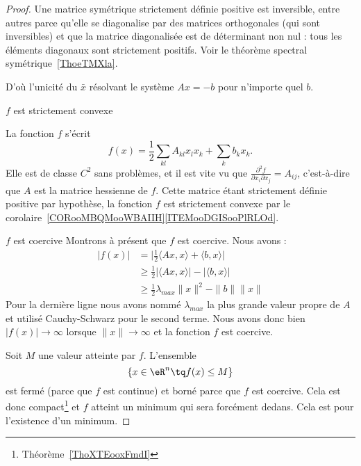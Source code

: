 \begin{proof}

	Une matrice symétrique strictement définie positive est inversible, entre autres parce qu'elle se diagonalise par des matrices orthogonales (qui sont inversibles) et que la matrice diagonalisée est de déterminant non nul : tous les éléments diagonaux sont strictement positifs. Voir le théorème spectral symétrique~\ref{ThoeTMXla}.

	D'où l'unicité du \( \bar x\) résolvant le système \( Ax=-b\) pour n'importe quel \( b\).

	\begin{subproof}
		\item[\( f\) est strictement convexe]

		La fonction \( f\) s'écrit
		\begin{equation}
			f(x)=\frac{ 1 }{2}\sum_{kl}A_{kl}x_lx_k+\sum_kb_kx_k.
		\end{equation}
		Elle est de classe \( C^2\) sans problèmes, et il est vite vu que \( \frac{ \partial^2f }{ \partial x_i\partial x_j }=A_{ij}\), c'est-à-dire que \( A\) est la matrice hessienne de \( f\). Cette matrice étant strictement définie positive par hypothèse, la fonction \( f\) est strictement convexe par le corolaire~\ref{CORooMBQMooWBAIIH}\ref{ITEMooDGISooPlRLOd}.

		\item[\( f\) est coercive]
		Montrons à présent que \( f\) est coercive. Nous avons :
		\begin{subequations}
			\begin{align}
				| f(x) | & =\big| \frac{ 1 }{2}\langle Ax, x\rangle +\langle b, x\rangle  \big| \\
				         & \geq\frac{ 1 }{2}| \langle Ax, x\rangle  |-| \langle b, x\rangle  |  \\
				         & \geq\frac{ 1 }{2}\lambda_{max}\| x \|^2-\| b \|\| x \|
			\end{align}
		\end{subequations}
		Pour la dernière ligne nous avons nommé \( \lambda_{max}\) la plus grande valeur propre de \( A\) et utilisé Cauchy-Schwarz pour le second terme. Nous avons donc bien \( | f(x) |\to \infty\) lorsque \( \| x \|\to\infty\) et la fonction \( f\) est coercive.
	\end{subproof}

	Soit \( M\) une valeur atteinte par \( f\). L'ensemble
	\begin{equation}
		\{ x\in \eR^n\tq f(x)\leq M \}
	\end{equation}
	est fermé (parce que \( f\) est continue) et borné parce que \( f\) est coercive. Cela est donc compact\footnote{Théorème~\ref{ThoXTEooxFmdI}} et \( f\) atteint un minimum qui sera forcément dedans. Cela est pour l'existence d'un minimum.


\end{proof}
